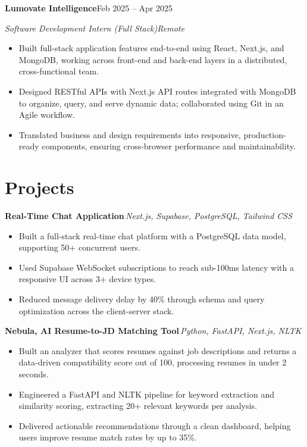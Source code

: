 \documentclass[11pt,letterpaper]{article}
\newcommand{\entry}[2]{%
  \vspace{1pt}\noindent\textbf{#1}\hfill\textit{\small #2}\par\nopagebreak\vspace{1pt}%
}
\newcommand{\gh}[1]{\,\href{#1}{\makebox[1.5em][l]{\normalfont\small\faGithub}}}
\newcommand{\org}[2]{%
  \vspace{1pt}\noindent\textbf{#1}\hfill {\small #2}\par\nopagebreak%
}
\newcommand{\role}[2]{%
  \noindent\textit{#1}\hfill\textit{\small #2}\par\nopagebreak\vspace{1pt}%
}
\begin{document}
\org{Lumovate Intelligence}{Feb 2025 -- Apr 2025}
\role{Software Development Intern (Full Stack)}{Remote}
\begin{itemize}
  \item Built full-stack application features end-to-end using React, Next.js, and MongoDB, working across front-end and back-end layers in a distributed, cross-functional team.
  \item Designed RESTful APIs with Next.js API routes integrated with MongoDB to organize, query, and serve dynamic data; collaborated using Git in an Agile workflow.
  \item Translated business and design requirements into responsive, production-ready components, ensuring cross-browser performance and maintainability.
\end{itemize}

\section*{Projects}

\entry{Real-Time Chat Application\gh{https://github.com/AkankshaGupta259/chat}}{Next.js, Supabase, PostgreSQL, Tailwind CSS}
\begin{itemize}
  \item Built a full-stack real-time chat platform with a PostgreSQL data model, supporting 50+ concurrent users.
  \item Used Supabase WebSocket subscriptions to reach sub-100ms latency with a responsive UI across 3+ device types.
  \item Reduced message delivery delay by 40\% through schema and query optimization across the client-server stack.
\end{itemize}

\entry{Nebula, AI Resume-to-JD Matching Tool\gh{https://github.com/AkankshaGupta259/nebula}}{Python, FastAPI, Next.js, NLTK}
\begin{itemize}
  \item Built an analyzer that scores resumes against job descriptions and returns a data-driven compatibility score out of 100, processing resumes in under 2 seconds.
  \item Engineered a FastAPI and NLTK pipeline for keyword extraction and similarity scoring, extracting 20+ relevant keywords per analysis.
  \item Delivered actionable recommendations through a clean dashboard, helping users improve resume match rates by up to 35\%.
\end{itemize}
\end{document}
